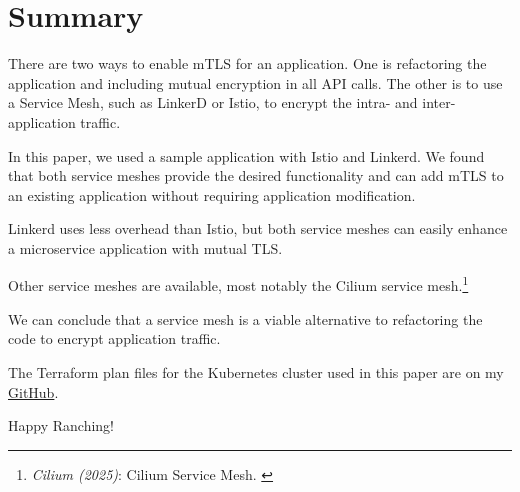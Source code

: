 %
%

\pagebreak
\section{Summary}

\onehalfspacing

There are two ways to enable mTLS for an application. One is refactoring the application and including mutual encryption in all API calls. The other is to use a Service Mesh, such as LinkerD or Istio, to encrypt the intra- and inter-application traffic.

In this paper, we used a sample application with Istio and Linkerd. We found that both service meshes provide the desired functionality and can add mTLS to an existing application without requiring application modification.

Linkerd uses less overhead than Istio, but both service meshes can easily enhance a microservice application with mutual TLS. 

Other service meshes are available, most notably the Cilium service mesh.\footnote{\textit{Cilium (2025)}: Cilium Service Mesh. \cite{ciliumMesh}}

We can conclude that a service mesh is a viable alternative to refactoring the code to encrypt application traffic.

The Terraform plan files for the Kubernetes cluster used in this paper are on my \href{https://github.com/chfrank-cgn/Rancher/tree/master/aks-cluster}{GitHub}.

Happy Ranching!
